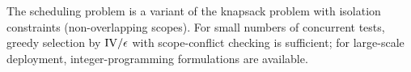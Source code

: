 \begin{remark}
\label{rem:knapsack}
The scheduling problem is a variant of the knapsack problem
with isolation constraints (non-overlapping scopes).  For small
numbers of concurrent tests, greedy selection by
$\mathrm{IV} / \epsilon$ with scope-conflict checking is
sufficient; for large-scale deployment, integer-programming
formulations are available.
\end{remark}
